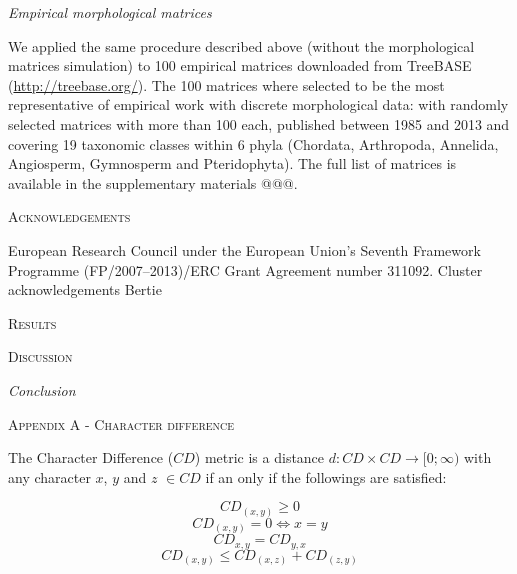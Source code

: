 \documentclass[12pt,letterpaper]{article}
\renewcommand{\section}[1]{%
\bigskip
\begin{center}
\begin{Large}
\normalfont\scshape #1
\medskip
\end{Large}
\end{center}}
\renewcommand{\subsection}[1]{%
\bigskip
\begin{center}
\begin{large}
\normalfont\itshape #1
\end{large}
\end{center}}
\begin{document}
\subsection{Empirical morphological matrices}

We applied the same procedure described above (without the morphological matrices simulation) to 100 empirical matrices downloaded from TreeBASE (\url{http://treebase.org/}).
The 100 matrices where selected to be the most representative of empirical work with discrete morphological data: with randomly selected matrices with more than 100 each, published between 1985 and 2013 and covering 19 taxonomic classes within 6 phyla (Chordata, Arthropoda, Annelida, Angiosperm, Gymnosperm and Pteridophyta).
The full list of matrices is available in the supplementary materials @@@.

\section{Acknowledgements}
European Research Council under the European Union’s Seventh Framework Programme (FP/2007–2013)/ERC Grant Agreement number 311092.
Cluster acknowledgements
Bertie

\section{Results}


\section{Discussion}


\subsection{Conclusion}




\section{Appendix A - Character difference}

The Character Difference ($CD$) metric is a distance $d: CD \times CD \rightarrow [0;\infty)$ with any character $x$, $y$ and $z$ $\in CD$ if an only if the followings are satisfied:

\begin{equation}
    \label{Positivity}
    CD_{(x,y)} \geq 0
\end{equation}
\begin{equation}
    \label{Identity}
    CD_{(x,y)} = 0 \Leftrightarrow x = y
\end{equation}
\begin{equation}
    \label{Equality}
    CD_{x,y} = CD_{y,x}
\end{equation}
\begin{equation}
    \label{Subadditivity}
    CD_{(x,y)} \leq CD_{(x,z)} + CD_{(z,y)}
\end{equation}
\end{document}
